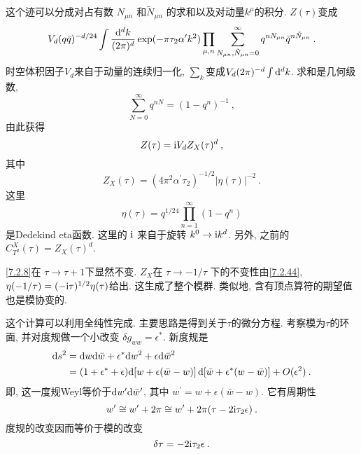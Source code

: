 这个迹可以分成对占有数 $N_{\mu n}$ 和$\tilde{N}_{\mu n}$ 的求和以及对动量$k^{\mu}$的积分.  $Z(\tau)$变成%
\begin{equation}
	V_{d}(q \bar{q})^{-d / 24} \int \frac{\mathrm{d}^{d} k}{(2 \pi)^{d}} \exp(-\pi \tau_{2} \alpha^{\prime} k^{2}) 
	\prod_{\mu, n} \sum_{N_{\mu n}, \tilde{N}_{\mu n}=0}^{\infty} q^{n N_{\mu n}} \bar{q}^{n \tilde{N}_{\mu n}} \:. \label{7.2.6}
\end{equation}
时空体积因子$V_{d}$来自于动量的连续归一化,  $\sum_{k}$变成$V_{d}(2 \pi)^{-d} \int \mathrm{d}^{d} k$. 求和是几何级数,
\begin{equation}
	\sum_{N=0}^{\infty} q^{n N}=(1-q^{n})^{-1} \:, \label{7.2.7}
\end{equation}
由此获得
\begin{equation}
	Z(\tau)=\mathrm{i} V_{d} Z_{X}(\tau)^{d} \:, \label{7.2.8}
\end{equation}
其中
\begin{equation}
	Z_{X}(\tau)= (4 \pi^{2} \alpha^{\prime} \tau_{2})^{-1 / 2}|\eta(\tau)|^{-2} \:. \label{7.2.9}
\end{equation}
这里
\begin{equation}
	\eta(\tau)=q^{1 / 24} \prod_{n=1}^{\infty}(1-q^{n}) \label{7.2.10}
\end{equation}
是Dedekind eta函数. 这里的 $\mathrm{i}$ 来自于旋转 $k^{0} \rightarrow \mathrm{i} k^{d}$. 另外, 之前的 $C_{T^{2}}^{X}(\tau)=Z_{X}(\tau)^{d}$.

\eqref{7.2.8}在 $\tau \rightarrow \tau+1$下显然不变.  $Z_{X}$在 $\tau \rightarrow-1 / \tau$ 下的不变性由\eqref{7.2.44}, 
$\eta(-1 / \tau)=(-\mathrm{i} \tau)^{1 / 2} \eta(\tau)$给出. 这生成了整个模群. 类似地, 含有顶点算符的期望值也是模协变的. 

这个计算可以利用全纯性完成. 主要思路是得到关于$\tau$的微分方程. 考察模为$\tau$的环面, 并对度规做一个小改变 $\delta g_{w w}=\epsilon^{*}$. 
新度规是
\begin{align}
	\mathrm{d} s^{2} &= \mathrm{d} w \mathrm{d} \bar{w}+\epsilon^{*} \mathrm{d} w^{2}+\epsilon \mathrm{d} \bar{w}^{2}  \nonumber \\
	&=(1+\epsilon^{*}+\epsilon) \mathrm{d}[w+\epsilon(\bar{w}-w)]\, \mathrm{d}[\bar{w}+\epsilon^{*}(w-\bar{w})]+O(\epsilon^{2}) \:. \label{7.2.11}
\end{align}
即, 这一度规Weyl等价于$\mathrm{d} w^{\prime} \mathrm{d} \bar{w}^{\prime}$, 其中 $w^{\prime}=w+\epsilon(\bar{w}-w)$. 它有周期性
\begin{equation}
	w^{\prime} \cong w^{\prime}+2 \pi \cong w^{\prime}+2 \pi(\tau-2 \mathrm{i} \tau_{2} \epsilon) \:. \label{7.2.12}
\end{equation}
度规的改变因而等价于模的改变
\begin{equation}
	\delta \tau=-2 \mathrm{i} \tau_{2} \epsilon \:. \label{7.2.13}
\end{equation}

